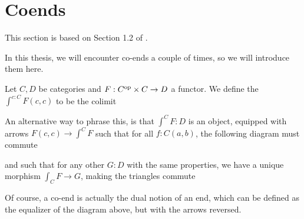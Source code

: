 \section{Coends}\label{sec:coends}
This section is based on Section 1.2 of \autocite{riehl}.

In this thesis, we will encounter co-ends a couple of times, so we will introduce them here.
\begin{definition}
  Let $ C, D $ be categories and $ F : C^{\text{op}} \times C \to D $ a functor. We define the  $ \int^{c : C} F(c, c) $ to be the colimit
  \begin{center}
  \end{center}
\end{definition}

\begin{remark}
  An alternative way to phrase this, is that $ \int^C F : D $ is an object, equipped with arrows $ F(c, c) \to \int^C F $ such that for all $ f: C(a, b) $, the following diagram must commute
  \begin{center}
  \end{center}
  and such that for any other $ G : D $ with the same properties, we have a unique morphism $ \int_C F \to G $, making the triangles commute
  \begin{center}
  \end{center}
\end{remark}

\begin{remark}
  Of course, a co-end is actually the dual notion of an end, which can be defined as the equalizer of the diagram above, but with the arrows reversed.
\end{remark}

